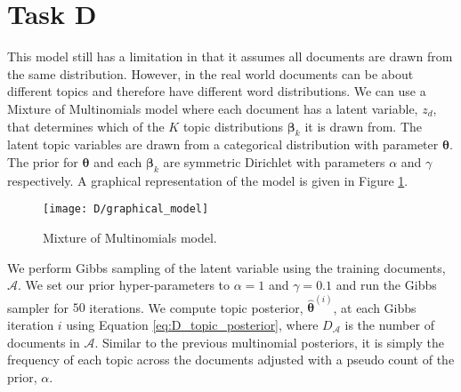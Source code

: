 \documentclass[11pt]{article}
\begin{document}
\section{Task D}
This model still has a limitation in that it assumes all documents are drawn from the same distribution. However, in the real world documents can be about different topics and therefore have different word distributions. We can use a Mixture of Multinomials model where each document has a latent variable, $z_d$, that determines which of the $K$ topic distributions $\boldsymbol{\beta}_k$ it is drawn from. The latent topic variables are drawn from a categorical distribution with parameter $\boldsymbol{\theta}$. The prior for $\boldsymbol{\theta}$ and each $\boldsymbol{\beta}_k$ are symmetric Dirichlet with parameters $\alpha$ and $\gamma$ respectively. A graphical representation of the model is given in Figure \ref{fig:D_graphical_model}.

\begin{figure}
    \centering
    \texttt{[image: D/graphical\_model]}
    \caption{Mixture of Multinomials model.}
    \label{fig:D_graphical_model}
\end{figure}
We perform Gibbs sampling of the latent variable using the training documents, $\mathcal{A}$. We set our prior hyper-parameters to $\alpha = 1$ and $\gamma = 0.1$ and run the Gibbs sampler for $50$ iterations. We compute topic posterior, $\boldsymbol{\hat \theta}^{(i)}$, at each Gibbs iteration $i$ using Equation \ref{eq:D_topic_posterior}, where $D_{\mathcal{A}}$ is the number of documents in $\mathcal{A}$. Similar to the previous multinomial posteriors, it is simply the frequency of each topic across the documents adjusted with a pseudo count of the prior, $\alpha$.
\end{document}
